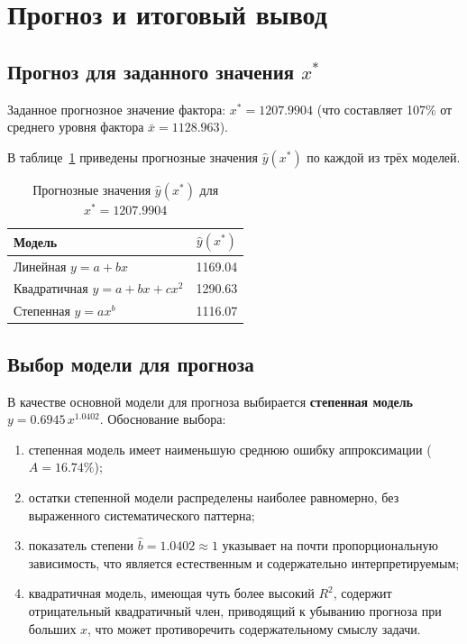 \section{Прогноз и итоговый вывод}

\subsection{Прогноз для заданного значения \(x^*\)}

Заданное прогнозное значение фактора: \(x^* = 1207.9904\) (что составляет 107\% от среднего уровня фактора \(\bar{x} = 1128.963\)).

В таблице~\ref{tab:prediction} приведены прогнозные значения \(\hat{y}(x^*)\) по каждой из трёх моделей.

\begin{table}[H]
\centering
\caption{Прогнозные значения \(\hat{y}(x^*)\) для \(x^* = 1207.9904\)}
\label{tab:prediction}
\begin{tabular}{lc}
\toprule
Модель & \(\hat{y}(x^*)\) \\
\midrule
Линейная \(y = a + bx\) & 1169.04 \\
Квадратичная \(y = a + bx + cx^2\) & 1290.63 \\
Степенная \(y = a x^b\) & 1116.07 \\
\bottomrule
\end{tabular}
\end{table}

\subsection{Выбор модели для прогноза}

В качестве основной модели для прогноза выбирается \textbf{степенная модель} \(y = 0.6945 \, x^{1.0402}\). Обоснование выбора:

\begin{enumerate}
    \item степенная модель имеет наименьшую среднюю ошибку аппроксимации (\(A = 16.74\%\));
    \item остатки степенной модели распределены наиболее равномерно, без выраженного систематического паттерна;
    \item показатель степени \(\hat{b} = 1.0402 \approx 1\) указывает на почти пропорциональную зависимость, что является естественным и содержательно интерпретируемым;
    \item квадратичная модель, имеющая чуть более высокий \(R^2\), содержит отрицательный квадратичный член, приводящий к убыванию прогноза при больших \(x\), что может противоречить содержательному смыслу задачи.
\end{enumerate}

